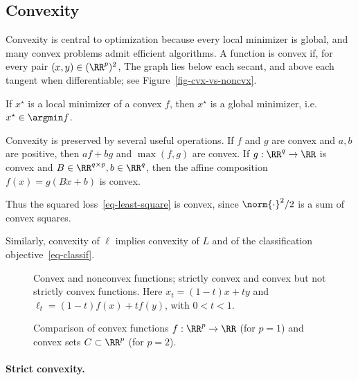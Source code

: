                                                                                   
\subsection{Convexity}

Convexity is central to optimization because every local minimizer is global, and many convex problems admit efficient algorithms. A function is convex if, for every pair $(x,y) \in (\RR^p)^2$,
The graph lies below each secant, and above each tangent when differentiable; see Figure~\ref{fig-cvx-vs-noncvx}.
 
If $x^\star$ is a local minimizer of a convex $f$, then $x^\star$ is a global minimizer, i.e. $x^\star \in \argmin f$.  


Convexity is preserved by several useful operations. If $f$ and $g$ are convex and $a, b$ are positive, then $a f + b g$ and $\max(f,g)$ are convex. If $g : \RR^q \rightarrow \RR$ is convex and $B \in \RR^{q \times p}, b \in \RR^q$, then the affine composition $f(x) = g(B x+b)$ is convex.
 
Thus the squared loss~\eqref{eq-least-square} is convex, since $\norm{\cdot}^2/2$ is a sum of convex squares.
 
Similarly, convexity of $\ell$ implies convexity of $L$ and of the classification objective~\eqref{eq-classif}.

\begin{figure}[tbp]
\centering
{}\hfill
{}\hfill
{}\hfill
{}
\caption{Convex and nonconvex functions; strictly convex and convex but not strictly convex functions. Here $x_t=(1-t)x+ty$ and $\ell_t=(1-t)f(x)+tf(y)$, with $0<t<1$.}
\label{fig-cvx-vs-noncvx}
\label{fig-cvx-vs-noncvx-continued}
\end{figure}




\begin{figure}[tbp]
\centering
{}
\caption{Comparison of convex functions $f : \RR^p \rightarrow \RR$ (for $p=1$) and convex sets $C \subset \RR^p$ (for $p=2$).}
\label{fig-cvx-set}
\end{figure}

   
\paragraph{Strict convexity.}

